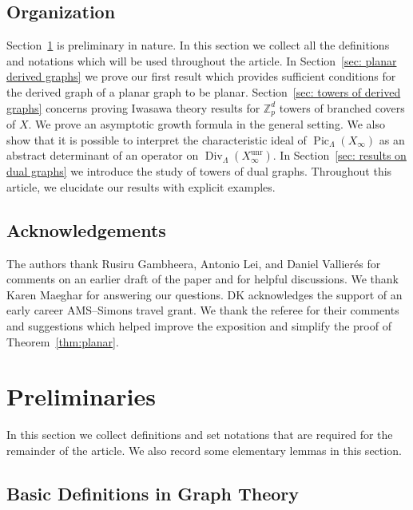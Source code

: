 \documentclass{amsart}
\numberwithin{equation}{section}
\theoremstyle{remark}
\newcommand{\Div}{\operatorname{Div}}
\newcommand{\Pic}{\operatorname{Pic}}
\newcommand{\unr}{\operatorname{unr}}
\newcommand{\Z}{\mathbb{Z}}
\theoremstyle{plain} %
\begin{document}
\subsection*{Organization}
Section~\ref{sec: prelim} is preliminary in nature.
In this section we collect all the definitions and notations which will be used throughout the article.
In Section~\ref{sec: planar derived graphs} we prove our first result which provides sufficient conditions for the derived graph of a planar graph to be planar.
Section~\ref{sec: towers of derived graphs} concerns proving Iwasawa theory results for $\Z_p^d$ towers of branched covers of $X$.
We prove an asymptotic growth formula in the general setting.
We also show that it is possible to interpret the characteristic ideal of $\Pic_{\Lambda}(X_\infty)$ as an abstract determinant of an operator on $\Div_{\Lambda}(X_\infty^{\unr})$.
In Section~\ref{sec: results on dual graphs} we introduce the study of towers of dual graphs.
Throughout this article, we elucidate our results with explicit examples.


\subsection*{Acknowledgements}
The authors thank Rusiru Gambheera, Antonio Lei, and Daniel Vallier{\'e}s for comments on an earlier draft of the paper and for helpful discussions.
{We thank Karen Maeghar for answering our questions.
DK acknowledges the support of an early career AMS--Simons travel grant.
We thank the referee for their comments and suggestions which helped improve the exposition and simplify the proof of Theorem~\ref{thm:planar}.}

\section{Preliminaries}
\label{sec: prelim}

In this section we collect definitions and set notations that are required for the remainder of the article.
We also record some elementary lemmas in this section.

\subsection{Basic Definitions in Graph Theory}
\end{document}
